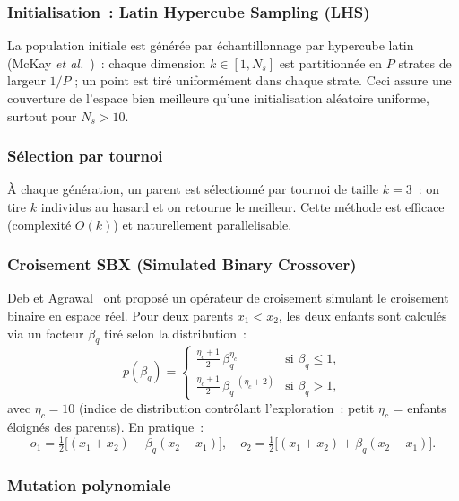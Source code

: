 \documentclass[12pt,a4paper]{article}
\begin{document}
\subsubsection{Initialisation~: Latin Hypercube Sampling (LHS)}

La population initiale est générée par échantillonnage par hypercube latin
(McKay \textit{et al.}~\cite{McKay1979})~: chaque dimension $k \in [1, N_s]$ est
partitionnée en $P$ strates de largeur $1/P$ ; un point est tiré uniformément
dans chaque strate. Ceci assure une couverture de l'espace bien meilleure
qu'une initialisation aléatoire uniforme, surtout pour $N_s > 10$.

\subsubsection{Sélection par tournoi}

À chaque génération, un parent est sélectionné par tournoi de taille $k=3$~:
on tire $k$ individus au hasard et on retourne le meilleur. Cette méthode est
efficace (complexité $O(k)$) et naturellement parallelisable.

\subsubsection{Croisement SBX (Simulated Binary Crossover)}

Deb et Agrawal~\cite{Deb1995} ont proposé un opérateur de croisement simulant
le croisement binaire en espace réel. Pour deux parents $x_1 < x_2$, les deux
enfants sont calculés via un facteur $\beta_q$ tiré selon la distribution~:
\begin{equation}
    p(\beta_q) = \begin{cases}
        \frac{\eta_c+1}{2}\,\beta_q^{\eta_c} & \text{si } \beta_q \leq 1, \\
        \frac{\eta_c+1}{2}\,\beta_q^{-(\eta_c+2)} & \text{si } \beta_q > 1,
    \end{cases}
    \label{eq:sbx-pdf}
\end{equation}
avec $\eta_c = 10$ (indice de distribution contrôlant l'exploration~: petit $\eta_c$
= enfants éloignés des parents). En pratique~:
\begin{equation}
    o_1 = \tfrac{1}{2}\bigl[(x_1+x_2) - \beta_q(x_2-x_1)\bigr], \quad
    o_2 = \tfrac{1}{2}\bigl[(x_1+x_2) + \beta_q(x_2-x_1)\bigr].
    \label{eq:sbx-children}
\end{equation}

\subsubsection{Mutation polynomiale}
\end{document}
